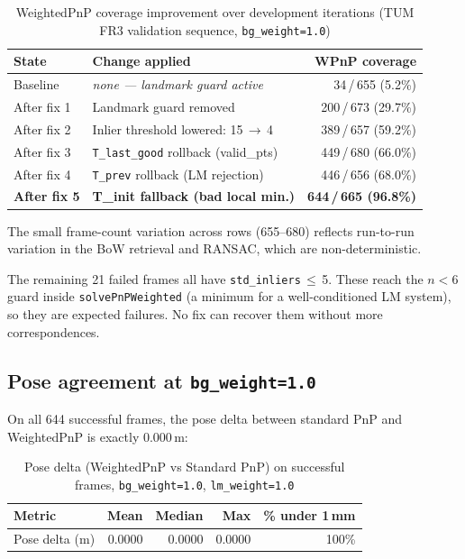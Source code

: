 \documentclass[12pt,a4paper]{article}
\begin{document}
\begin{table}[H]
\centering
\caption{WeightedPnP coverage improvement over development iterations
         (TUM FR3 validation sequence, \texttt{bg\_weight=1.0})}
\begin{tabular}{llr}
\toprule
State & Change applied & WPnP coverage \\
\midrule
Baseline & \emph{none --- landmark guard active} & 34\,/\,655\; (5.2\%) \\
After fix 1 & Landmark guard removed & 200\,/\,673\; (29.7\%) \\
After fix 2 & Inlier threshold lowered: 15\,$\to$\,4 & 389\,/\,657\; (59.2\%) \\
After fix 3 & \texttt{T\_last\_good} rollback (valid\_pts) & 449\,/\,680\; (66.0\%) \\
After fix 4 & \texttt{T\_prev} rollback (LM rejection) & 446\,/\,656\; (68.0\%) \\
\textbf{After fix 5} & \textbf{T\_init fallback (bad local min.)} & \textbf{644\,/\,665\; (96.8\%)} \\
\bottomrule
\end{tabular}
\end{table}

\begin{notebox}
The small frame-count variation across rows (655--680) reflects run-to-run variation
in the BoW retrieval and RANSAC, which are non-deterministic.
\end{notebox}

The remaining 21 failed frames all have \texttt{std\_inliers}\,$\leq$\,5. These
reach the $n < 6$ guard inside \texttt{solvePnPWeighted} (a minimum for a
well-conditioned LM system), so they are expected failures. No fix can recover them
without more correspondences.

\subsection{Pose agreement at \texttt{bg\_weight=1.0}}

On all 644 successful frames, the pose delta between standard PnP and WeightedPnP
is exactly 0.000\,m:

\begin{table}[H]
\centering
\caption{Pose delta (WeightedPnP vs Standard PnP) on successful frames,
         \texttt{bg\_weight=1.0}, \texttt{lm\_weight=1.0}}
\begin{tabular}{lrrrr}
\toprule
Metric & Mean & Median & Max & \% under 1\,mm \\
\midrule
Pose delta (m) & 0.0000 & 0.0000 & 0.0000 & 100\% \\
\bottomrule
\end{tabular}
\end{table}
\end{document}
